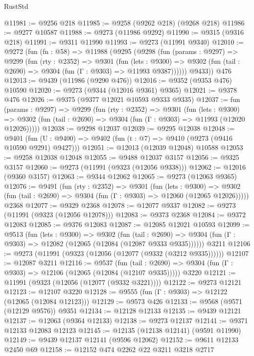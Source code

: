 \begin{lexlean}{RustStd}
\begin{coremodule}
{\begin{coremodule}
{{{{{{{{{{{{{{{{{{{{{{{{{{{{{{{{{{{{{{{{{{{{{{{{{{{{{{{@11981 := @9256 @218
@11985 := @9258 (@9262 @218) (@9268 @218)
@11986 := @9277 @10587
@11988 := @9273 (@11986 @9292)
@11990 := @9315 (@9316 @218)
@11991 := @9311 @11990
@11993 := @9273 (@11991 @9340)
@12010 := @9272
    (fun (fn : @58) =>
    @11988
      (@9295
        (@9298
          (fun (params : @9297) =>
          @9299
            (fun (rty : @2352) =>
            @9301
              (fun (lets : @9300) =>
              @9302 (fun (tail : @2690) => @9304 (fun (Γ : @9303) => @11993 @9387))))))
        @9433))
    @476
@12013 := @9439 (@11986 (@9290 @476))
@12016 := @9352 (@9353 @476) @10590
@12020 := @9273 (@9344 (@12016 @9361) @9365)
@12021 := @9378 @476
@12026 := @9375 (@9377 @12021 @10593 @9333 @9335)
@12037 := fun (params : @9297) =>
  @9299
    (fun (rty : @2352) =>
    @9301
      (fun (lets : @9300) =>
      @9302 (fun (tail : @2690) => @9304 (fun (Γ : @9303) => @11993 (@12020 @12026)))))
@12038 := @9298 @12037
@12039 := @9295 @12038
@12048 := @9401
    (fun (U : @9400) => @9402 (fun (t : @7) => @9410 (@9273 (@9416 @10590 @9291) @9427)))
@12051 := @12013 (@12039 @12048) @10588
@12053 := @9258 @12038 @12048
@12055 := @9488 @12037 @3157
@12056 := @9325 @3157
@12060 := @9273 (@11991 (@9323 (@12056 @9338)))
@12062 := @12016 (@9360 @3157)
@12063 := @9344 @12062
@12065 := @9273 (@12063 @9365)
@12076 := @9491
    (fun (rty : @2352) =>
    @9301
      (fun (lets : @9300) =>
      @9302 (fun (tail : @2690) => @9304 (fun (Γ : @9303) => @12060 (@12065 @12026)))))
    @2368
@12077 := @9329 @2368
@12078 := @12077 @9337
@12082 := @9273 (@11991 (@9323 (@12056 @12078)))
@12083 := @9373 @2368
@12084 := @9372 @12083
@12085 := @9376 @12083
@12087 := @12085 @12021 @10593
@12099 := @9513
    (fun (lets : @9300) =>
    @9302
      (fun (tail : @2690) =>
      @9304 (fun (Γ : @9303) => @12082 (@12065 (@12084 (@12087 @9333 @9335))))))
    @3211
@12106 := @9273 (@11991 (@9323 (@12056 (@12077 (@9332 (@3212 @9335))))))
@12107 := @12087 @3211
@12116 := @9537
    (fun (tail : @2690) => @9304 (fun (Γ : @9303) => @12106 (@12065 (@12084 (@12107 @9335)))))
    @3220
@12121 := @11991 (@9323 (@12056 (@12077 (@9332 @3221))))
@12122 := @9273 @12121
@12123 := @12107 @3220
@12128 := @9555 (fun (Γ : @9303) => @12122 (@12065 (@12084 @12123)))
@12129 := @9573 @426
@12133 := @9568 (@9571 (@12129 @9576)) @9351
@12134 := @12128 @12133
@12135 := @9439 @12121
@12137 := @12063 (@9364 @12133)
@12138 := @9273 @12137
@12141 := @9371 @12133 @12083 @12123
@12145 := @12135 (@12138 @12141) (@9591 @11990)
@12149 := @9439 @12137 @12141 (@9596 @12062)
@12152 := @9611 @12133 @2450 @69
@12158 := @12152 @474 @2262 @22 @3211 @3218 @2717
}}}}}}}}}}}}}}}}}}}}}}}}}}}}}}}}}}}}}}}}}}}}}}}}}}}}}}}
\end{coremodule}}
\end{coremodule}
\end{lexlean}
